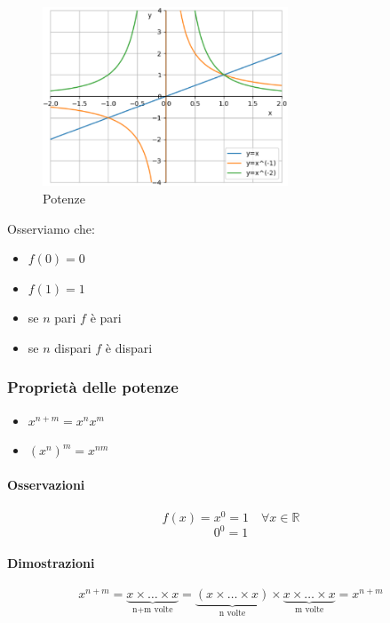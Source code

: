 \documentclass[11pt,a4paper,notitlepage]{report}
\let\numberset\mathbb
\newcommand{\R}{\numberset{R}}
\begin{document}
\begin{figure}
  \begin{center}
    \includegraphics[width=0.65\textwidth]{images/potenze.png}
  \end{center}
  \caption{Potenze}
\end{figure}

Osserviamo che:
\begin{itemize}
	\item $f(0)=0$
	\item $f(1)=1$
	\item se $n$ pari $f$ è pari
	\item se $n$ dispari $f$ è dispari
\end{itemize}

\subsubsection{Proprietà delle potenze}
\begin{itemize}
\item $x^{n+m}=x^n x^m$
\item $(x^n)^m=x^{nm}$
\end{itemize}

\paragraph{Osservazioni}
\[f(x)=x^0=1 \quad \forall x \in \R\]
\[0^0=1\]

\paragraph{Dimostrazioni}

\[x^{n+m}= \underbrace{x \times \dots \times x}_{\text{n+m volte}}=\underbrace{(x \times \dots \times x)}_{\text{n volte}}\times \underbrace{x \times \dots \times x}_{\text{m volte}}=x^{n+m}\]
\end{document}
